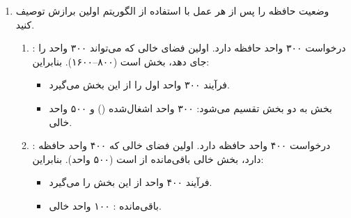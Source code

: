 \begin{enumerate}
	\item وضعیت حافظه را پس از هر عمل با استفاده از الگوریتم اولین برازش توصیف کنید.
	\begin{qsolve}
		\begin{enumerate}
			\item {}: درخواست ۳۰۰ واحد حافظه دارد. اولین فضای خالی که می‌تواند ۳۰۰ واحد را جای دهد، بخش  است (۸۰۰–۱۶۰۰). بنابراین:
			\begin{itemize}
				\item فرآیند  ۳۰۰ واحد اول را از این بخش می‌گیرد.
				\item بخش  به دو بخش تقسیم می‌شود: ۳۰۰ واحد اشغال‌شده () و ۵۰۰ واحد خالی.
			\end{itemize}
			
			
			\item {}: درخواست ۴۰۰ واحد حافظه دارد. اولین فضای خالی که ۴۰۰ واحد حافظه دارد، بخش خالی باقی‌مانده از  است (۵۰۰ واحد). بنابراین:
			\begin{itemize}
				\item فرآیند  ۴۰۰ واحد از این بخش را می‌گیرد.
				\item باقی‌مانده : ۱۰۰ واحد خالی.
			\end{itemize}
		\end{enumerate}
	\end{qsolve}
\end{enumerate}
\newpage


